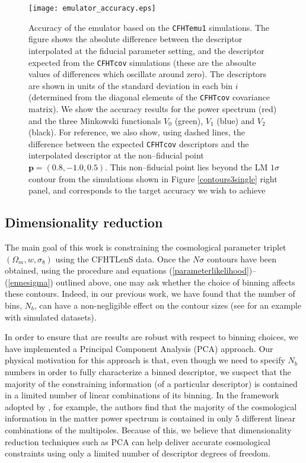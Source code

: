 \documentclass[reprint,aps,prd,superscriptaddress,showkeys,showpacs]{revtex4-1}
\begin{document}
\begin{figure*}
\begin{center}
\texttt{[image: emulator\_accuracy.eps]}
\end{center}
\caption{Accuracy of the emulator based on the \texttt{CFHTemu1}
  simulations. The figure shows the absolute difference between the descriptor
  interpolated at the fiducial parameter setting, and the descriptor
  expected from the \texttt{CFHTcov} simulations (these are the absoulte values of differences which oscillate around zero). The descriptors are
  shown in units of the standard deviation in each bin $i$ (determined
  from the diagonal elements of the \texttt{CFHTcov} covariance
  matrix). We show the accuracy results for the power spectrum (red)
  and the three Minkowski functionals $V_0$ (green), $V_1$ (blue) and
  $V_2$ (black). For reference, we also show, using dashed lines, the
  difference between the expected \texttt{CFHTcov} descriptors and the
  interpolated descriptor at the non--fiducial point $\mathbf{p}=(0.8,-1.0,0.5)$. This non--fiducial point lies beyond the LM $1\sigma$ contour from the simulations shown in Figure \ref{contours3single} right panel, and corresponds to the target accuracy we wish to achieve}
\label{emulatorAccuracy}
\end{figure*}  

\subsection{Dimensionality reduction}
\label{pcasection}

The main goal of this work is constraining the cosmological parameter
triplet $(\Omega_m,w,\sigma_8)$ using the CFHTLenS data.  Once the
$N\sigma$ contours have been obtained, using the procedure and
equations (\ref{parameterlikelihood})--(\ref{ennesigma}) outlined
above, one may ask whether the choice of binning affects these
contours.  Indeed, in our previous work, we have found that the number
of bins, $N_b$, can have a non-negligible effect on the contour sizes
(see \citep{Petri2013} for an example with simulated datasets).

In order to ensure that are results are robust with respect to binning
choices, we have implemented a Principal Component Analysis (PCA)
approach. Our physical motivation for this approach is that, even
though we need to specify $N_b$ numbers in order to fully characterize
a binned descriptor, we suspect that the majority of the constraining
information (of a particular descriptor) is contained in a limited
number of linear combinations of its binning. In the framework adopted
by \citep{coyote2}, for example, the authors find that the majority of
the cosmological information in the matter power spectrum is contained
in only 5 different linear combinations of the multipoles. Because of
this, we believe that dimensionality reduction techniques such as PCA
can help deliver accurate cosmological constraints using only a
limited number of descriptor degrees of freedom.
\end{document}
